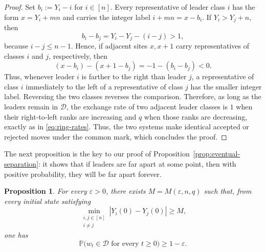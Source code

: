 \documentclass[11pt,a4paper]{amsart}
\newtheorem{proposition}[theorem]{Proposition}
\theoremstyle{definition}
\theoremstyle{remark}
\numberwithin{equation}{section}
\newcommand{\Pp}{\mathbb P}
\newcommand{\cD}{\mathcal D}
\newcommand{\abs}[1]{\left|#1\right|}
\begin{document}
	\begin{proof}
		Set $b_i:=Y_i-i$ for $i\in[n]$.  Every representative of leader class $i$
		has the form $x=Y_i+mn$ and carries the integer label $i+mn=x-b_i$.
		If $Y_i>Y_j+n$, then
		\begin{equation}\label{eq:b-order}
			b_i-b_j=Y_i-Y_j-(i-j)>1,
		\end{equation}
		because $i-j\le n-1$.  Hence, if adjacent sites $x,x+1$ carry
		representatives of classes $i$ and $j$, respectively, then
		\begin{equation}\label{eq:adjacent-label-comparison}
			(x-b_i)-(x+1-b_j)=-1-(b_i-b_j)<0.
		\end{equation}
		Thus, whenever leader $i$ is farther to the right than leader $j$, a
		representative of class $i$ immediately to the left of a representative of
		class $j$ has the smaller integer label.  Reversing the two classes reverses
		the comparison.  Therefore, as long as the leaders remain in $\cD$, the
		exchange rate of two adjacent leader classes is $1$ when their right-to-left
		ranks are increasing and $q$ when those ranks are decreasing, exactly as in
		\eqref{eq:ring-rates}.
		Thus, the two systems make identical accepted or rejected moves under the common mark, which concludes the proof. 
	\end{proof}
	
	The next proposition is the key to our proof of Proposition~\ref{prop:eventual-separation}: it shows that if leaders are far apart at some point, then with positive probability, they will be far apart forever. 
	
	\begin{proposition}\label{prop:leaders-separate}
		For every $\varepsilon>0$, there exists $M=M(\varepsilon,n,q)$ such that,
		from every initial state satisfying
		\begin{equation}\label{eq:M-separated-initial}
			\min_{\substack{i,j\in[n]\\i\ne j}}
			\abs{Y_i(0)-Y_j(0)}\ge M,
		\end{equation}
		one has
		\begin{equation}\label{eq:survival-safe-probability}
			\Pp\bigl(w_t\in\cD\text{ for every }t\ge0\bigr)
			\ge1-\varepsilon.
		\end{equation}
	\end{proposition}
	
\end{document}
